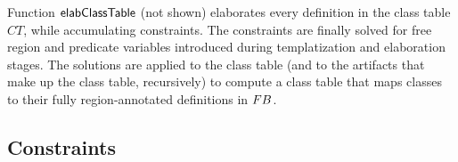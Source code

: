 

Function ${\sf elabClassTable}$ (not shown) elaborates
every definition in the class table $CT$, while accumulating
constraints. The constraints are finally solved for free region and
predicate variables introduced during templatization and elaboration
stages. The solutions are applied to the class table (and to the
artifacts that make up the class table, recursively) to compute a
class table that maps classes to their fully region-annotated
definitions in ${\sc FB}$.


\subsection{Constraints}
\label{sec:constraints}

